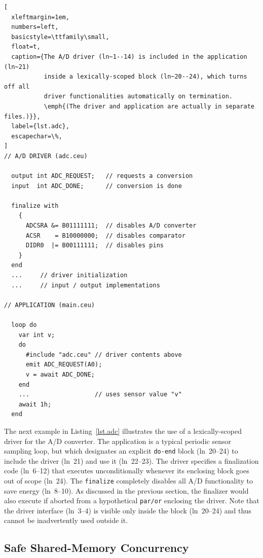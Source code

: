 \documentclass[sigplan,10pt,review,anonymous]{acmart}\settopmatter{printfolios=true,printccs=false,printacmref=false}
\newcommand{\code}[1] {{\small{\texttt{#1}}}}
\begin{document}
\begin{lstlisting}[
  xleftmargin=1em,
  numbers=left,
  basicstyle=\ttfamily\small,
  float=t,
  caption={The A/D driver (ln~1--14) is included in the application (ln~21)
           inside a lexically-scoped block (ln~20--24), which turns off all
           driver functionalities automatically on termination.
           \emph{(The driver and application are actually in separate files.)}},
  label={lst.adc},
  escapechar=\%,
]
// A/D DRIVER (adc.ceu)

  output int ADC_REQUEST;   // requests a conversion
  input  int ADC_DONE;      // conversion is done

  finalize with
    {
      ADCSRA &= B01111111;  // disables A/D converter
      ACSR    = B10000000;  // disables comparator
      DIDR0  |= B00111111;  // disables pins
    }
  end
  ...     // driver initialization
  ...     // input / output implementations

// APPLICATION (main.ceu)

  loop do
    var int v;
    do
      #include "adc.ceu" // driver contents above
      emit ADC_REQUEST(A0);
      v = await ADC_DONE;
    end
    ...                  // uses sensor value "v"
    await 1h;
  end
\end{lstlisting}

The next example in Listing~\ref{lst.adc} illustrates the use of a
lexically-scoped driver for the A/D converter.
%
The application is a typical periodic sensor sampling loop, but which
designates an explicit \code{do-end} block (ln~20--24) to include the driver
(ln~21) and use it (ln~22--23).
%
The driver specifies a finalization code (ln~6--12) that executes
unconditionally whenever its enclosing block goes out of scope (ln~24).
The \code{finalize} completely disables all A/D functionality to save energy
(ln~8--10).
%
As discussed in the previous section, the finalizer would also execute if
aborted from a hypothetical \code{par/or} enclosing the driver.
%
Note that the driver interface (ln~3--4) is visible only inside the block
(ln~20--24) and thus cannot be inadvertently used outside it.

\subsection{Safe Shared-Memory Concurrency}
\label{sec.ceu.shared}
\end{document}
